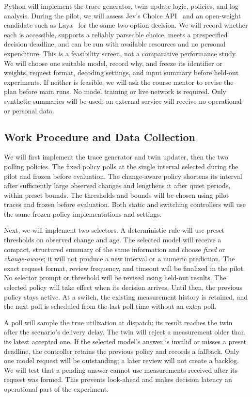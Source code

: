 \documentclass[11pt,a4paper]{article}
\begin{document}
Python will implement the trace generator, twin update logic, policies, and log analysis. During the pilot, we will assess Jev's Choice API~\cite{choice} and an open-weight candidate such as Laya~\cite{laya} for the same two-option decision. We will record whether each is accessible, supports a reliably parseable choice, meets a prespecified decision deadline, and can be run with available resources and no personal expenditure. This is a feasibility screen, not a comparative performance study. We will choose one suitable model, record why, and freeze its identifier or weights, request format, decoding settings, and input summary before held-out experiments. If neither is feasible, we will ask the course mentor to revise the plan before main runs. No model training or live network is required. Only synthetic summaries will be used; an external service will receive no operational or personal data.

\subsection{Work Procedure and Data Collection}
We will first implement the trace generator and twin updater, then the two polling policies. The fixed policy polls at the single interval selected during the pilot and frozen before evaluation. The change-aware policy shortens its interval after sufficiently large observed changes and lengthens it after quiet periods, within preset bounds. The thresholds and bounds will be chosen using pilot traces and frozen before evaluation. Both static and switching controllers will use the same frozen policy implementations and settings.

Next, we will implement two selectors. A deterministic rule will use preset thresholds on observed change and age. The selected model will receive a compact, structured summary of the same information and choose \emph{fixed} or \emph{change-aware}; it will not produce a new interval or a numeric prediction. The exact request format, review frequency, and timeout will be finalized in the pilot. No selector prompt or threshold will be revised using held-out results. The selected policy will take effect when its decision arrives. Until then, the previous policy stays active. At a switch, the existing measurement history is retained, and the next poll is scheduled from the last poll time without an extra poll.

A poll will sample the true utilization at dispatch; its result reaches the twin after the scenario's delivery delay. The twin will reject a measurement older than its latest accepted one. If the selected model's answer is invalid or misses a preset deadline, the controller retains the previous policy and records a fallback. Only one model request will be outstanding; a later review will not create a backlog. We will test that a pending answer cannot use measurements received after its request was formed. This prevents look-ahead and makes decision latency an operational part of the experiment.
\end{document}
